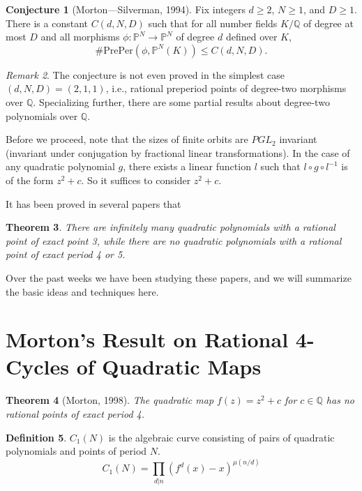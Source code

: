 \documentclass{amsart}
\theoremstyle{plain}
\newtheorem{theorem}{Theorem}[section]
\theoremstyle{definition}
\newtheorem{definition}[theorem]{Definition}
\newtheorem{conjecture}[theorem]{Conjecture}
\theoremstyle{remark}
\newtheorem{remark}[theorem]{Remark}
\renewcommand{\P}{\mathbb{P}}
\newcommand{\Q}{\mathbb{Q}}
\newcommand{\preper}{\mathrm{PrePer}}
\begin{document}
\begin{conjecture}[Morton---Silverman, 1994]
  Fix integers $d \ge 2$, $N \ge 1$, and $D \ge 1$. There is a
  constant $C(d, N, D)$ such that for all number fields $K/\Q$ of
  degree at most $D$ and all morphisms $\phi: \P^N \to \P^N$ of degree
  $d$ defined over $K$,
  \[
  \#\preper(\phi, \P^N(K)) \le C(d, N, D).
  \]
\end{conjecture}

\begin{remark}
  The conjecture is not even proved in the simplest case $(d, N, D) =
  (2, 1, 1)$, i.e., rational preperiod points of degree-two morphisms
  over $\Q$. Specializing further, there are some partial results
  about degree-two polynomials over $\Q$.

  Before we proceed, note that the sizes of finite orbits are $PGL_2$
  invariant (invariant under conjugation by fractional linear
  transformations). In the case of any quadratic polynomial $g$, there
  exists a linear function $l$ such that $l \circ g \circ l^{-1}$ is
  of the form $z^2 + c$. So it suffices to consider $z^2 + c$.

  It has been proved in several papers that
\end{remark}

\begin{theorem}
  There are infinitely many quadratic polynomials with a rational
  point of exact point 3, while there are no quadratic polynomials
  with a rational point of exact period 4 or 5.
\end{theorem}

Over the past weeks we have been studying these papers, and we will
summarize the basic ideas and techniques here.

\section{Morton's Result on Rational 4-Cycles of Quadratic Maps}

\begin{theorem} [Morton, 1998]
	The quadratic map $f(z) = z^2 + c$ for $c \in \Q$ has no rational
	points of exact period 4.
\end{theorem}

\begin{definition}
	$C_1(N)$ is the algebraic curve consisting of pairs of quadratic
	polynomials and points of period $N$.
	\[
	C_1(N) = \prod_{d|n}(f^d(x) - x)^{\mu(n/d)}
	\]
\end{definition}
\end{document}
